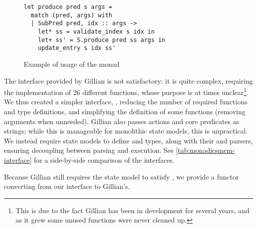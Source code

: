 \begin{figure}
\begin{lstlisting}
let produce pred s args =
  match (pred, args) with
  | SubPred pred, idx :: args ->
    let* ss = validate_index s idx in
    let+ ss' = S.produce pred ss args in
    update_entry s idx ss'
\end{lstlisting}
\caption{Example of usage of the  monad}
\label{fig:example-delayed}
\end{figure}

The interface provided by Gillian is not satisfactory: it is quite complex, requiring the implementation of 26 different functions, whose purpose is at times unclear\footnote{This is due to the fact Gillian has been in development for several years, and as it grew some unused functions were never cleaned up.}. We thus created a simpler interface, , reducing the number of required functions and type definitions, and simplifying the definition of some functions (removing arguments when unneeded). Gillian also passes actions and core predicates as strings; while this is manageable for monolithic state models, this is unpractical. We instead require state models to define  and  types, along with their  and  parsers, ensuring decoupling between parsing and execution. See \autoref{tab:monadicsmem-interface} for a side-by-side comparison of the interfaces.

Because Gillian still requires the state model to satisfy , we provide a  functor converting from our interface to Gillian's.

